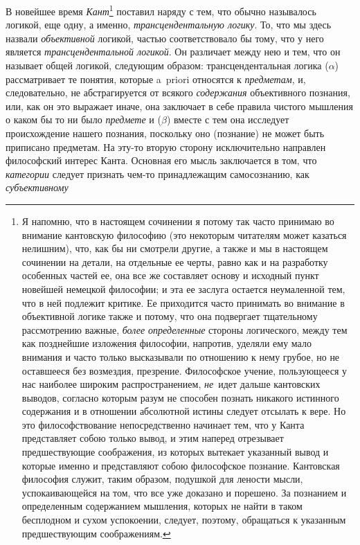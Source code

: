 В новейшее время {\em Кант}\footnote{
Я напомню, что в настоящем сочинении я потому так часто принимаю во
внимание кантовскую философию (это некоторым читателям может казаться
нелишним), что, как бы ни смотрели другие, а также и мы в настоящем
сочинении на детали, на отдельные ее черты, равно как и на разработку
особенных частей ее, она все же составляет основу и исходный пункт новейшей
немецкой философии; и эта ее заслуга остается неумаленной тем, что в ней
подлежит критике. Ее приходится часто принимать во внимание в объективной
логике также и потому, что она подвергает тщательному рассмотрению важные,
{\em более определенные} стороны логического, между тем как
позднейшие изложения философии, напротив, уделяли ему мало внимания и часто
только высказывали по отношению к нему грубое, но не оставшееся без
возмездия, презрение. Философское учение, пользующееся у нас наиболее
широким распространением, {\em не}~идет дальше кантовских
выводов, согласно которым разум не способен познать никакого истинного
содержания и в отношении абсолютной истины следует отсылать к вере. Но это
философствование непосредственно начинает тем, что у Канта представляет
собою только вывод, и этим наперед отрезывает предшествующие соображения,
из которых вытекает указанный вывод и которые именно и представляют собою
философское познание. Кантовская философия служит, таким образом, подушкой
для лености мысли, успокаивающейся на том, что все уже доказано и порешено.
За познанием и определенным содержанием мышления, которых не найти в таком
бесплодном и сухом успокоении, следует, поэтому, обращаться к указанным
предшествующим соображениям.} поставил наряду с тем,
что обычно называлось логикой, еще одну, а именно,
{\em трансцендентальную логику}. То, что мы здесь
назвали {\em объективной} логикой, частью
соответствовало бы тому, что у него является
{\em трансцендентальной логикой}. Он различает между
нею и тем, что он называет общей логикой, следующим образом:
трансцендентальная логика ($\alpha$) рассматривает те понятия, которые
a~priori относятся к {\em предметам}, и, следовательно,
не абстрагируется от всякого {\em содержания}
объективного познания, или, как он это выражает иначе, она заключает в себе
правила чистого мышления о каком бы то ни было
{\em предмете} и ($\beta$) вместе с тем она исследует
происхождение нашего познания, поскольку оно (познание) не может быть
приписано предметам. На эту-то вторую сторону исключительно направлен
философский интерес Канта. Основная его мысль заключается в том, что
{\em категории} следует признать чем-то принадлежащим
самосознанию, как {\em субъективному}
